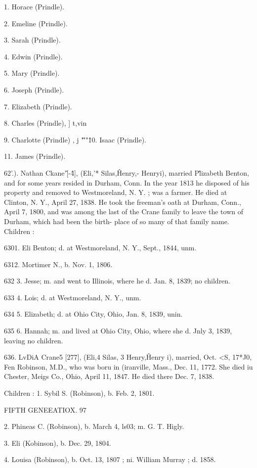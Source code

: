 \documentclass{book}
\begin{document}
1. Horace (Prindle). 

2. Emeline (Prindle). 

3. Sarah (Prindle). 

4. Edwin (Prindle). 

5. Mary (Prindle). 

6. Joseph (Prindle). 

7. Elizabeth (Prindle). 

8. Charles (Prindle), ] t,vin 

9. Charlotte (Prindle) , j "\^ '"\^ 

10. Isaac (Prindle). 

11. James (Prindle). 

62'.). Nathan Ckane'\^ [-\^4], (Eli,'* Silas,\^ Henry,- Henryi), 
married P\^lizabeth Benton, and for some years resided in Durham, 
Conn. In the year 1813 he disposed of his property and removed 
to Westmoreland, N. Y. ; was a farmer. He died at Clinton, 
N. Y., April 27, 1838. He took the freeman's oath at Durham, 
Conn., April 7, 1800, and was among the last of the Crane 
family to leave the town of Durham, which had been the birth- 
place of so many of that family name. Children : 

6301. Eli Benton; d. at Westmoreland, N. Y., Sept., 1844, unm. 

6312. Mortimer N., b. Nov. 1, 1806. 

632  3. Jesse; m. and went to Illinois, where he d. Jan. 8, 1839; no 
children. 

633  4. Lois; d. at Westmoreland, N. Y., unm. 

634  5. Elizabeth; d. at Ohio City, Ohio, Jan. 8, 1839, unin. 

635  6. Hannah; m. and lived at Ohio City, Ohio, where she d. Jnly 
3, 1839, leaving no children. 

636. LvDiA Crane5 [277], (Eli,4 Silas, 3 Henry,\^ Henry i), 
married, Oct. <S, 17*J0, Fen Robinson, M.D., who was boru in 
(iranville, Mass., Dec. 11, 1772. She died iu Chester, Meigs 
Co., Ohio, April 11, 1847. He died there Dec. 7, 1838. 

Children : 
1. Sybil S. (Robinson), b. Feb. 2, 1801. 



FIFTH GENEEATIOX. 97 

2. Phineas C. (Robinson), b. March 4, ls03; m. G. T. Higly. 

3. Eli (Kobinson), b. Dec. 29, 1804. 

4. Louisa (Robinson), b. Oct. 13, 1807 ; ni. William Murray ; d. 1858. 
\end{document}
